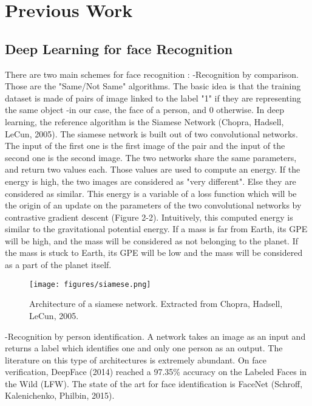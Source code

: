 \section{Previous Work}
\subsection{Deep Learning for face Recognition}
There are two main schemes for face recognition :\newline
-Recognition by comparison. Those are the "Same/Not Same" algorithms. The basic idea is that the training dataset is made of pairs of image linked to the label "1" if they are representing the same object -in our case, the face of a person, and 0 otherwise. In deep learning, the reference algorithm is the Siamese Network (Chopra, Hadsell, LeCun, 2005). The siamese network is built out of two convolutional networks. The input of the first one is the first image of the pair and the input of the second one is the second image. The two networks share the same parameters, and return two values each. Those values are used to compute an energy. If the energy is high, the two images are considered as "very different". Else they are considered as similar. This energy is a variable of a loss function which will be the origin of an update on the parameters of the two convolutional networks by contrastive gradient descent (Figure 2-2). Intuitively, this computed energy is similar to the gravitational potential energy. If a mass is far from Earth, its GPE will be high, and the mass will be considered as not belonging to the planet. If the mass is stuck to Earth, its GPE will be low and the mass will be considered as a part of the planet itself.


\begin{figure}[!ht]
  \centering
  \texttt{[image: figures/siamese.png]}  
  \caption[Architecture of a siamese network. Extracted from Chopra, Hadsell, LeCun, 2005.]{Architecture of a siamese network. Extracted from Chopra, Hadsell, LeCun, 2005.}
  \protect\label{fig:Siamese}
\end{figure}

-Recognition by person identification. A network takes an image as an input and returns a label which identifies one and only one person as an output. The literature on this type of architectures is extremely abundant. On face verification, DeepFace (2014) reached a 97.35\% accuracy on the Labeled Faces in the Wild (LFW). The state of the art for face identification is FaceNet (Schroff, Kalenichenko, Philbin, 2015).

